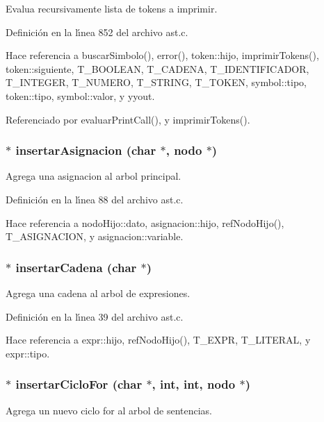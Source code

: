 Evalua recursivamente lista de tokens a imprimir. 



Definici\'{o}n en la l\'{\i}nea 852 del archivo ast.c.

Hace referencia a buscar\-Simbolo(), error(), token::hijo, imprimir\-Tokens(), token::siguiente, T\_\-BOOLEAN, T\_\-CADENA, T\_\-IDENTIFICADOR, T\_\-INTEGER, T\_\-NUMERO, T\_\-STRING, T\_\-TOKEN, symbol::tipo, token::tipo, symbol::valor, y yyout.

Referenciado por evaluar\-Print\-Call(), y imprimir\-Tokens().
\subsubsection{$\ast$ insertar\-Asignacion (char $\ast$, {\bf nodo} $\ast$)}\label{ast_8h_a22}


Agrega una asignacion al arbol principal. 



Definici\'{o}n en la l\'{\i}nea 88 del archivo ast.c.

Hace referencia a nodo\-Hijo::dato, asignacion::hijo, ref\-Nodo\-Hijo(), T\_\-ASIGNACION, y asignacion::variable.
\subsubsection{$\ast$ insertar\-Cadena (char $\ast$)}\label{ast_8h_a19}


Agrega una cadena al arbol de expresiones. 



Definici\'{o}n en la l\'{\i}nea 39 del archivo ast.c.

Hace referencia a expr::hijo, ref\-Nodo\-Hijo(), T\_\-EXPR, T\_\-LITERAL, y expr::tipo.
\subsubsection{$\ast$ insertar\-Ciclo\-For (char $\ast$, int, int, {\bf nodo} $\ast$)}\label{ast_8h_a27}


Agrega un nuevo ciclo for al arbol de sentencias. 



